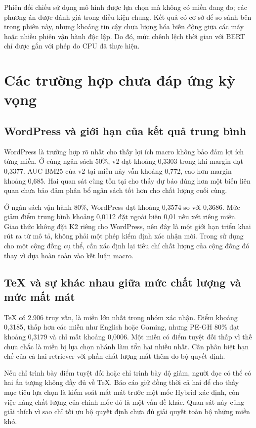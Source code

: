 Phiên đối chiếu sử dụng mô hình được lựa chọn mà không có miền đang đo; các phương án được đánh giá trong điều kiện chung. Kết quả có cơ sở để so sánh bên trong phiên này, nhưng khoảng tin cậy chưa lượng hóa biến động giữa các máy hoặc nhiều phiên vận hành độc lập. Do đó, mức chênh lệch thời gian với BERT chỉ được gắn với phép đo CPU đã thực hiện.

\section{Các trường hợp chưa đáp ứng kỳ vọng}
\subsection{WordPress và giới hạn của kết quả trung bình}
WordPress là trường hợp rõ nhất cho thấy lợi ích macro không bảo đảm lợi ích từng miền. Ở cùng ngân sách 50\%, v2 đạt khoảng 0,3303 trong khi margin đạt 0,3377. AUC BM25 của v2 tại miền này vẫn khoảng 0,772, cao hơn margin khoảng 0,685. Hai quan sát cùng tồn tại cho thấy dự báo đúng hơn một biến liên quan chưa bảo đảm phân bổ ngân sách tốt hơn cho chất lượng cuối cùng.

Ở ngân sách vận hành 80\%, WordPress đạt khoảng 0,3574 so với \Hstar{} 0,3686. Mức giảm điểm trung bình khoảng 0,0112 đặt ngoài biên 0,01 nếu xét riêng miền. Giao thức không đặt K2 riêng cho WordPress, nên đây là một giới hạn triển khai rút ra từ mô tả, không phải một phép kiểm định xác nhận mới. Trong sử dụng cho một cộng đồng cụ thể, cần xác định lại tiêu chí chất lượng của cộng đồng đó thay vì dựa hoàn toàn vào kết luận macro.

\subsection{TeX và sự khác nhau giữa mức chất lượng và mức mất mát}
TeX có 2.906 truy vấn, là miền lớn nhất trong nhóm xác nhận. Điểm \Hstar{} khoảng 0,3185, thấp hơn các miền như English hoặc Gaming, nhưng PE-GH 80\% đạt khoảng 0,3179 và chỉ mất khoảng 0,0006. Một miền có điểm tuyệt đối thấp vì thế chưa chắc là miền bị lựa chọn nhánh làm tổn hại nhiều nhất. Cần phân biệt hạn chế của cả hai retriever với phần chất lượng mất thêm do bộ quyết định.

Nếu chỉ trình bày điểm tuyệt đối hoặc chỉ trình bày độ giảm, người đọc có thể có hai ấn tượng không đầy đủ về TeX. Báo cáo giữ đồng thời cả hai để cho thấy mục tiêu lựa chọn là kiểm soát mất mát trước một mốc Hybrid xác định, còn việc nâng chất lượng của chính mốc đó là một vấn đề khác. Quan sát này cũng giải thích vì sao chỉ tối ưu bộ quyết định chưa đủ giải quyết toàn bộ những miền khó.

